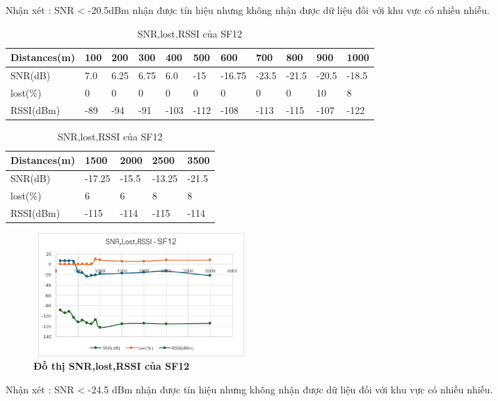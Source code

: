 \documentclass{article} %
\begin{document}
	Nhận xét : SNR < -20.5dBm nhận được tín hiệu nhưng không nhận được dữ liệu đối với khu vực có nhiều nhiễu.
	
	
	\begin{table}[H]
		\centering
		\begin{tabular}{|l|l|l|l|l|l|l|l|l|l|l|}
			\hline
			\textbf{Distances(m)} & \textbf{100} & \textbf{200} & \textbf{300} & \textbf{400} & \textbf{500} & \textbf{600} & \textbf{700} & \textbf{800} & \textbf{900} & \textbf{1000} \\ \hline
			SNR(dB)       & 7.0          & 6.25         & 6.75         & 6.0          & -15          & -16.75       & -23.5        & -21.5        & -20.5        & -18.5         \\ \hline
			lost(\%)      & 0         & 0         & 0         & 0         & 0         & 0         & 0         & 0         & 10         & 8          \\ \hline
			RSSI(dBm)     & -89          & -94          & -91          & -103         & -112         & -108         & -113         & -115         & -107         & -122          \\ \hline
		\end{tabular}
		\caption{SNR,lost,RSSI của SF12  }
		\label{SF12}
	\end{table}
	
	\begin{table}[H]
		\centering
		\begin{tabular}{|l|l|l|l|l|}
			\hline
			\textbf{Distances(m)} & \textbf{1500} & \textbf{2000} & \textbf{2500} & \textbf{3500} \\ \hline
			SNR(dB)       & -17.25        & -15.5         & -13.25        & -21.5         \\ \hline
			lost(\%)      & 6          & 6          & 8          & 8          \\ \hline
			RSSI(dBm)     & -115          & -114          & -115          & -114          \\ \hline
		\end{tabular}
		\caption{SNR,lost,RSSI của SF12  }
		\label{SF12_2}
	\end{table}
	
	
	\begin{figure}[!ht]
		\centering
		\includegraphics[width=8.2cm,height=4.7cm]{Images/sf12.png}
		\caption[ Đồ thị SNR,lost,RSSI của SF12 ]{\bfseries \fontsize{12pt}{0pt}\selectfont  Đồ thị SNR,lost,RSSI của SF12}
		\label{sf12}
	\end{figure}
	Nhận xét : SNR < -24.5 dBm nhận được tín hiệu nhưng không nhận được dữ liệu đối với khu vực có nhiều nhiễu.
	
\end{document}
